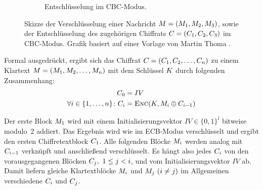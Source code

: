 \begin{figure}[h]
\begin{subfigure}[h]{.45\textwidth}
		\caption{Entschlüsselung im CBC-Modus.}
	\end{subfigure}
	\caption{Skizze der Verschlüsselung einer Nachricht $M = (M_{1},M_{2},M_{3})$, sowie der Entschlüsselung des zugehörigen Chiffrats $C = (C_{1},C_{2},C_{3})$ im CBC-Modus. Grafik basiert auf einer Vorlage von Martin Thoma \cite{Thoma2013}.}
	\label{pc:cbc}
\end{figure}

Formal ausgedrückt, ergibt sich das Chiffrat $C =  (C_{1},C_{2},\dots,C_{n})$ zu einem Klartext $M = (M_{1},M_{2},\dots,M_{n})$ mit dem Schlüssel $K$ durch folgenden Zusammenhang:
\begin{align*}
	C_0 &= IV\\
	\forall i \in \{1,\dots,n\}\colon C_i &= \textsc{Enc}(K, M_i \oplus C_{i-1})
\end{align*}

Der erste Block $M_1$ wird mit einem Initialisierungsvektor $IV \in \{0,1\}^{l}$ \indexIV bitweise modulo~2 addiert. Das Ergebnis wird wie im ECB-Modus verschlüsselt und ergibt den ersten Chiffretextblock $C_1$.
Alle folgenden Blöcke $M_i$ werden analog mit $C_{i-1}$ verknüpft und anschließend verschlüsselt. Es hängt also jedes $C_i$ von den vorausgegangenen Blöcken $C_j,\ 1\leq j<i$, und vom Initialisierungsvektor $IV$ ab. Damit liefern gleiche Klartextblöcke $M_i$ und $M_j\ (i\neq j)$ im Allgemeinen verschiedene $C_i$ und $C_j$.

